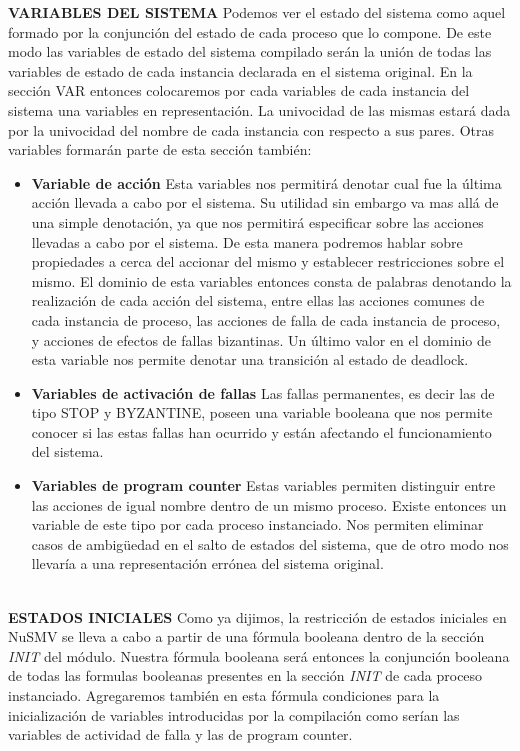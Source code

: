 \documentclass[titlepage, 12pt]{book}
\begin{document}
\textbf{VARIABLES DEL SISTEMA}
Podemos ver el estado del sistema como aquel formado por la conjunci\'on del estado de cada proceso que lo compone. De este modo las variables de estado del sistema compilado ser\'an la uni\'on de todas las variables de estado de cada instancia declarada en el sistema original. En la secci\'on VAR entonces colocaremos por cada variables de cada instancia del sistema una variables en representaci\'on. La univocidad de las mismas estar\'a dada por la univocidad del nombre de cada instancia con respecto a sus pares. Otras variables formar\'an parte de esta secci\'on tambi\'en:
\begin{itemize}
\item \textbf{Variable de acci\'on} Esta variables nos permitir\'a denotar cual fue la \'ultima acci\'on llevada a cabo por el sistema. Su utilidad sin embargo va mas all\'a de una simple denotaci\'on, ya que nos permitir\'a especificar sobre las acciones llevadas a cabo por el sistema. De esta manera podremos hablar sobre propiedades a cerca del accionar del mismo y establecer restricciones sobre el mismo. El dominio de esta variables entonces consta de palabras denotando la realizaci\'on de cada acci\'on del sistema, entre ellas las acciones comunes de cada instancia de proceso, las acciones de falla de cada instancia de proceso, y acciones de efectos de fallas bizantinas. Un \'ultimo valor en el dominio de esta variable nos permite denotar una transici\'on al estado de deadlock.
\item \textbf{Variables de activaci\'on de fallas} Las fallas permanentes, es decir las de tipo STOP y BYZANTINE, poseen una variable booleana que nos permite conocer si las estas fallas han ocurrido y est\'an afectando el funcionamiento del sistema.
\item \textbf{Variables de program counter} Estas variables permiten distinguir entre las acciones de igual nombre dentro de un mismo proceso. Existe entonces un variable de este tipo por cada proceso instanciado. Nos permiten eliminar casos de ambigüedad en el salto de estados del sistema, que de otro modo nos llevar\'ia a una representaci\'on err\'onea del sistema original.
\end{itemize}
~\\

\textbf{ESTADOS INICIALES}
Como ya dijimos, la restricci\'on de estados iniciales en NuSMV se lleva a cabo a partir de una f\'ormula booleana dentro de la secci\'on \textit{INIT} del m\'odulo. Nuestra f\'ormula booleana ser\'a entonces la conjunci\'on booleana de todas las formulas booleanas presentes en la secci\'on \textit{INIT} de cada proceso instanciado. Agregaremos tambi\'en en esta f\'ormula condiciones para la inicializaci\'on de variables introducidas por la compilaci\'on como ser\'ian las variables de actividad de falla y las de program counter.\\
\end{document}
